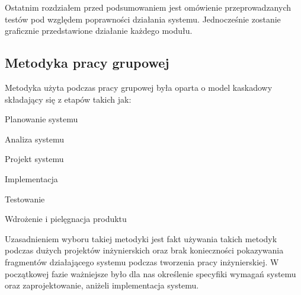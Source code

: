 Ostatnim rozdziałem przed podsumowaniem jest omówienie przeprowadzanych testów pod względem poprawności działania systemu. Jednocześnie zostanie graficznie przedstawione działanie każdego modułu.

\newpage
\subsection{Metodyka pracy grupowej}
Metodyka użyta podczas pracy grupowej była oparta o model kaskadowy składający się z etapów takich jak:
\begin{itemize*}
	\item Planowanie systemu
	\item Analiza systemu
	\item Projekt systemu
	\item Implementacja
	\item Testowanie
	\item Wdrożenie i pielęgnacja produktu
\end{itemize*}

Uzasadnieniem wyboru takiej metodyki jest fakt używania takich metodyk podczas dużych projektów inżynierskich oraz brak konieczności pokazywania fragmentów działającego systemu podczas tworzenia pracy inżynierskiej. W początkowej fazie ważniejsze było dla nas określenie specyfiki wymagań systemu oraz zaprojektowanie, aniżeli implementacja systemu.